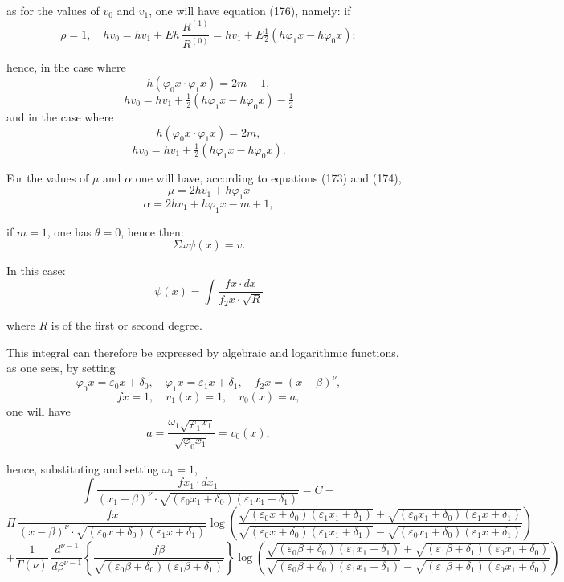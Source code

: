 \documentclass{article}
\begin{document}
as for the values of $v_0$ and $v_1$, one will have equation (176), namely:
if
\[ \rho = 1, \quad hv_0 = hv_1 + Eh\,\frac{R^{(1)}}{R^{(0)}} = hv_1 + E\tfrac{1}{2}(h\varphi_1 x-h\varphi_0 x); \]

hence, in the case where
\[ h(\varphi_0 x \cdot \varphi_1 x) = 2m-1, \]
\[ hv_0 = hv_1 + \tfrac{1}{2}(h\varphi_1 x-h\varphi_0 x) - \tfrac{1}{2} \]
and in the case where
\[ h(\varphi_0 x \cdot \varphi_1 x) = 2m, \]
\[ hv_0 = hv_1 + \tfrac{1}{2}(h\varphi_1 x-h\varphi_0 x). \]

For the values of $\mu$ and $\alpha$ one will have, according to equations (173) and (174),
\[ \mu = 2hv_1 + h\varphi_1 x \]
\[ \alpha = 2hv_1 + h\varphi_1 x - m + 1, \]

if $m = 1$, one has $\theta = 0$, hence then:
\[ \Sigma\omega\psi(x) = v. \]

In this case:
\[ \psi(x) = \int \frac{f x \cdot dx}{f_2 x \cdot \sqrt{R}} \]

where $R$ is of the first or second degree.

This integral can therefore be expressed by algebraic and logarithmic functions, as one sees, by setting
\[ \varphi_0 x = \varepsilon_0 x + \delta_0, \quad \varphi_1 x = \varepsilon_1 x + \delta_1, \quad f_2 x = (x-\beta)^{\nu}, \]
\[ f x = 1, \quad v_1(x) = 1, \quad v_0(x) = a, \]
one will have
\[ a = \frac{\omega_1\sqrt{\varphi_1 x_1}}{\sqrt{\varphi_0 x_1}} = v_0(x), \]

hence, substituting and setting $\omega_1 = 1$,
\[ \int \frac{f x_1 \cdot dx_1}{(x_1-\beta)^{\nu} \cdot \sqrt{(\varepsilon_0 x_1+\delta_0)(\varepsilon_1 x_1+\delta_1)}} = C - \tag{204} \]
\[ \Pi\,\frac{f x}{(x-\beta)^{\nu} \cdot \sqrt{(\varepsilon_0 x+\delta_0)(\varepsilon_1 x+\delta_1)}}\log\left(\frac{\sqrt{(\varepsilon_0 x+\delta_0)(\varepsilon_1 x_1+\delta_1)}+\sqrt{(\varepsilon_0 x_1+\delta_0)(\varepsilon_1 x+\delta_1)}}{\sqrt{(\varepsilon_0 x+\delta_0)(\varepsilon_1 x_1+\delta_1)}-\sqrt{(\varepsilon_0 x_1+\delta_0)(\varepsilon_1 x+\delta_1)}}\right) \]
\[ + \frac{1}{\Gamma(\nu)}\,\frac{d^{\nu-1}}{d\beta^{\nu-1}} \left\{ \frac{f\beta}{\sqrt{(\varepsilon_0\beta+\delta_0)(\varepsilon_1\beta+\delta_1)}} \right\} \log\left(\frac{\sqrt{(\varepsilon_0\beta+\delta_0)(\varepsilon_1 x_1+\delta_1)}+\sqrt{(\varepsilon_1\beta+\delta_1)(\varepsilon_0 x_1+\delta_0)}}{\sqrt{(\varepsilon_0\beta+\delta_0)(\varepsilon_1 x_1+\delta_1)}-\sqrt{(\varepsilon_1\beta+\delta_1)(\varepsilon_0 x_1+\delta_0)}}\right) \]
\end{document}
